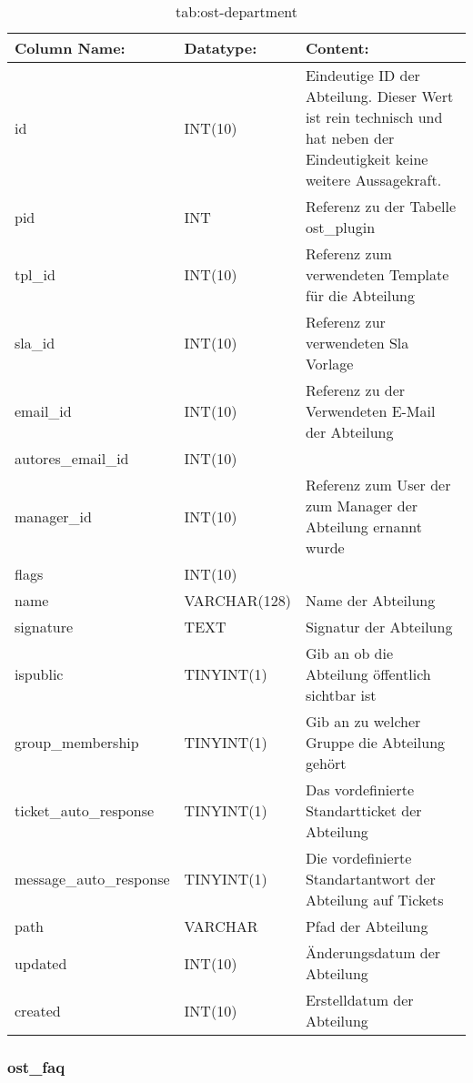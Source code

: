 \begin{table}[h]
	\begin{tabular}{|p{3.5cm}|p{4cm}|p{6.2cm}|}
		\hline
		\textbf{Column Name:} & \textbf{Datatype:} & \textbf{Content:}\\
		\hline
		id & INT(10) & Eindeutige ID der Abteilung. Dieser Wert ist rein technisch und hat  neben der Eindeutigkeit keine weitere 
		Aussagekraft.\\
		\hline
		pid & INT & Referenz zu der Tabelle ost\_plugin \\
		\hline
		tpl\_id & INT(10) & Referenz zum verwendeten Template für die Abteilung\\
		\hline
		sla\_id & INT(10) & Referenz zur verwendeten Sla Vorlage\\
		\hline
		email\_id & INT(10) & Referenz zu der Verwendeten E-Mail der Abteilung\\
		\hline
		autores\_email\_id & INT(10) & \\
		\hline
		manager\_id & INT(10) & Referenz zum User der zum Manager der Abteilung ernannt wurde\\
		\hline
		flags & INT(10) & \\
		\hline
		name & VARCHAR(128) & Name der Abteilung \\
		\hline
		signature & TEXT & Signatur der Abteilung \\
		\hline
		ispublic & TINYINT(1) & Gib an ob die Abteilung öffentlich sichtbar ist \\
		\hline
		group\_membership & TINYINT(1) & Gib an zu welcher Gruppe die Abteilung gehört \\
		\hline
		ticket\_auto\_response & TINYINT(1) & Das vordefinierte Standartticket der Abteilung \\
		\hline
		message\_auto\_response & TINYINT(1) & Die vordefinierte Standartantwort der Abteilung auf Tickets \\
		\hline
		path & VARCHAR & Pfad der Abteilung\\
		\hline
		updated & INT(10) & Änderungsdatum der Abteilung\\
		\hline
		created & INT(10) & Erstelldatum der Abteilung\\
		\hline
	\end{tabular}
	\caption{tab:ost-department}
\end{table}
\label{tab:ost_department}

\newpage


\subsubsection{ost\_faq}

